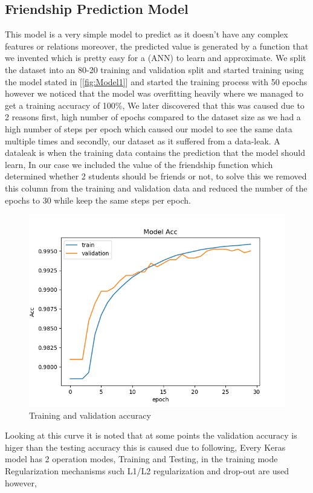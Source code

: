 \subsection{Friendship Prediction Model}
This model is a very simple model to predict as it doesn't have any complex features or relations moreover, the predicted value is generated by a function that we invented which is pretty easy for a (ANN) to learn and approximate.
We split the dataset into an 80-20 training and validation split and started training using the model stated in [\ref{fig:Model1}] and started the training process with 50 epochs however we noticed that the model was overfitting heavily where we managed to get a training accuracy of 100\%, We later discovered that this was caused due to 2 reasons first, high number of epochs compared to the dataset size as we had a high number of steps per epoch which caused our model to see the same data multiple times and secondly, our dataset as it suffered from a data-leak.
A dataleak is when the training data contains the prediction that the model should learn, In our case we included the value of the friendship function which determined whether 2 students should be friends or not, to solve this we removed this column from the training and validation data and reduced the number of the epochs to 30 while keep the same steps per epoch.
\begin{figure}[H]
    \centering
    \includegraphics[scale=1]{FriendMod}
    \caption{Training and validation accuracy}
    \label{fig:ResultFriends}
\end{figure}
Looking at this curve it is noted that at some points the validation accuracy is higer than the testing accuracy this is caused due to following, Every Keras model has 2 operation modes, Training and Testing, in the training mode Regularization mechanisms such L1/L2 regularization and drop-out are used however,
